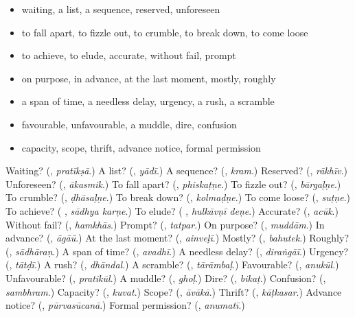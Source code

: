\begin{itemize}
\raggedright
  \item waiting, a list, a sequence, reserved, unforeseen
  \item to fall apart, to fizzle out, to crumble, to break down, to come loose
  \item to achieve, to elude, accurate, without fail, prompt
  \item on purpose, in advance, at the last moment, mostly, roughly
  \item a span of time, a needless delay, urgency, a rush, a scramble
  \item favourable, unfavourable, a muddle, dire, confusion
  \item capacity, scope, thrift, advance notice, formal permission
\end{itemize}

\begin{tcolorbox}[breakable,colback=teal!4,colframe=teal!35!black,title={Before you move on}]
Waiting? (\textbf{}, \emph{pratīkṣā}.) A list? (\textbf{}, \emph{yādī}.) A sequence? (\textbf{}, \emph{kram}.) Reserved? (\textbf{}, \emph{rākhīv}.) Unforeseen? (\textbf{}, \emph{ākasmik}.) To fall apart? (\textbf{}, \emph{phiskaṭṇe}.) To fizzle out? (\textbf{}, \emph{bārgaḷṇe}.) To crumble? (\textbf{}, \emph{ḍhāsaḷṇe}.) To break down? (\textbf{}, \emph{kolmaḍṇe}.) To come loose? (\textbf{}, \emph{suṭṇe}.) To achieve? (\textbf{ }, \emph{sādhya karṇe}.) To elude? (\textbf{ }, \emph{hulkāvṇī deṇe}.) Accurate? (\textbf{}, \emph{acūk}.) Without fail? (\textbf{}, \emph{hamkhās}.) Prompt? (\textbf{}, \emph{tatpar}.) On purpose? (\textbf{}, \emph{muddām}.) In advance? (\textbf{}, \emph{āgāū}.) At the last moment? (\textbf{}, \emph{ainveḷī}.) Mostly? (\textbf{}, \emph{bahutek}.) Roughly? (\textbf{}, \emph{sādhāraṇ}.) A span of time? (\textbf{}, \emph{avadhī}.) A needless delay? (\textbf{}, \emph{diraṅgāī}.) Urgency? (\textbf{}, \emph{tātḍī}.) A rush? (\textbf{}, \emph{dhāndal}.) A scramble? (\textbf{}, \emph{tārāmbaḷ}.) Favourable? (\textbf{}, \emph{anukūl}.) Unfavourable? (\textbf{}, \emph{pratikūl}.) A muddle? (\textbf{}, \emph{ghoḷ}.) Dire? (\textbf{}, \emph{bikaṭ}.) Confusion? (\textbf{}, \emph{sambhram}.) Capacity? (\textbf{}, \emph{kuvat}.) Scope? (\textbf{}, \emph{āvākā}.) Thrift? (\textbf{}, \emph{kāṭkasar}.) Advance notice? (\textbf{}, \emph{pūrvasūcanā}.) Formal permission? (\textbf{}, \emph{anumatī}.)
\end{tcolorbox}
